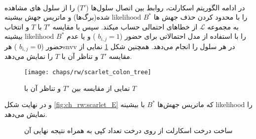 \\
در ادامه  الگوریتم اسکارلت، روابط بین اتصال سلول‌ها ($T'$) را  از سلول های مشاهده شده(برگ‌ها) و ماتریس جهش بیشینه
 \gls{likelihood} $B^*$  را با محدود کردن حذف جهش ها به مجموعه
$\mathcal{L}$
از خطاهای احتمالی حساب میکند. سپس با مقایسه $T'$ با $T$ و انتخاب بیشینه  \gls{likelihood} $B^*$ را با استفاده از مدل احتمالاتی برای حضور ($b_{i,j} = 1$ )  و یا عدم حضور ($b_{i,j} = 0$ ) هر\gls{snvv} در هر سلول را انجام می‌دهد. همچنین شکل \ref{fig:ch_rw:scarlet_colon_tree} نمایی از مقایسه $T'$ و تناظر آن با $T$ را نمایش می‌دهد.
\begin{figure}[!ht]
	\centerline{\texttt{[image: chaps/rw/scarlet\_colon\_tree]}}
	\caption{نمایی از مقایسه بین $T'$ و تناظر آن با $T$ }
	\label{fig:ch_rw:scarlet_colon_tree}
\end{figure}
و  در نهایت شکل \ref{fig:ch_rw:scarlet_E} که ماتریس جهش‌ها  $B^*$ با بیشینه \gls{likelihood} را نمایش می‌دهد.


\begin{figure}[!ht]
	\centering
	\hfill
	\caption{ساخت درخت اسکارلت از روی درخت تعداد کپی به همراه نتیجه نهایی آن}
	\label{fig:ch_re:scarlet_final_res}
\end{figure}

